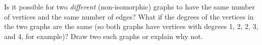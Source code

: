 \documentclass{book}
\begin{document}
\setcounter{cpjt}{9}
\addtocounter{cpjt}{-1}
\begin{activity}\label{activity-5}
\hypertarget{p-78}{}%
Is it possible for two \emph{different} (non-isomorphic) graphs to have the same number of vertices and the same number of edges? What if the degrees of the vertices in the two graphs are the same (so both graphs have vertices with degrees 1, 2, 2, 3, and 4, for example)? Draw two such graphs or explain why not.%
\par\smallskip%
\noindent\end{activity}

\clearpage
\end{document}
